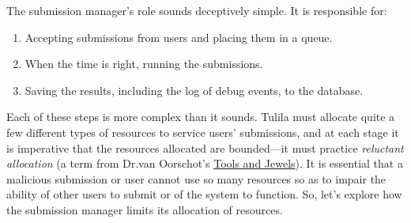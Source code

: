 \documentclass[12pt]{article}
\begin{document}
The submission manager's role sounds deceptively simple. It is responsible for:
\begin{enumerate}
  \item Accepting submissions from users and placing them in a queue.
  \item When the time is right, running the submissions.
  \item Saving the results, including the log of debug events, to the database.
\end{enumerate}

Each of these steps is more complex than it sounds. Tulila must allocate quite a few different types of resources to service users' submissions, and at each stage it is imperative that the resources allocated are bounded---it must practice \textit{reluctant allocation} (a term from Dr.\@ van Oorschot's \href{https://people.scs.carleton.ca/~paulv/toolsjewels/TJrev1/ch1-rev1.pdf}{Tools and Jewels}). It is essential that a malicious submission or user cannot use so many resources so as to impair the ability of other users to submit or of the system to function. So, let's explore how the submission manager limits its allocation of resources.
\end{document}
